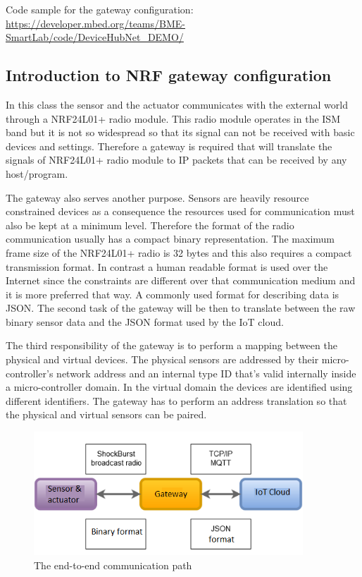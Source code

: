 \documentclass[a4paper]{article}
\begin{document}
Code sample for the gateway configuration: 
\url{https://developer.mbed.org/teams/BME-SmartLab/code/DeviceHubNet_DEMO/}

\subsection{Introduction to NRF gateway configuration}

In this class the sensor and the actuator communicates with the external world through
a NRF24L01+ radio module. This radio module operates in the ISM band but it is not so 
widespread so that its signal can not be received with basic devices and settings. Therefore a
gateway is required that will translate the signals of NRF24L01+ radio module to IP packets
that can be received by any host/program.

The gateway also serves another purpose. Sensors are heavily resource constrained devices as 
a consequence the resources used for communication must also be kept at a minimum level.
Therefore the format of the radio communication usually has a compact binary representation.
The maximum frame size of the NRF24L01+ radio is 32 bytes and this also requires a compact transmission
format. In contrast a human readable format is used over the Internet since
the constraints are different over that communication medium and it is more preferred that way.
A commonly used format for describing data is JSON. The second task of the gateway will be then
to translate between the raw binary sensor data and the JSON format used by the IoT cloud.

The third responsibility of the gateway is to perform a mapping between the physical and virtual
devices. The physical sensors are addressed by their micro-controller's network address and an 
internal type ID that's valid internally inside a micro-controller domain.
In the virtual domain the devices are identified using different identifiers. The gateway
has to perform an address translation so that the physical and virtual sensors can be paired.

\begin{figure}[H]
    \centering
    \includegraphics[width=0.9\textwidth]{figures/gateway.png}
    \caption{The end-to-end communication path}
    \label{fig:gateway}
\end{figure}
\end{document}
